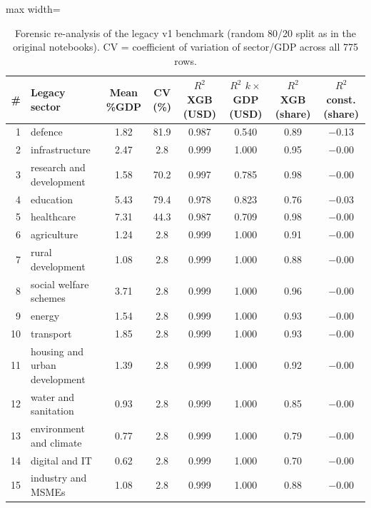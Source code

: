 \begin{table}
\caption{Forensic re-analysis of the legacy v1 benchmark (random 80/20 split as in the original notebooks). CV = coefficient of variation of sector/GDP across all 775 rows.}\label{tab:audit}
\centering\small
\renewcommand{\arraystretch}{1.1}
\begin{adjustbox}{max width=\linewidth}
\begin{tabular}{rlcccccc}
\toprule
\# & Legacy sector & Mean \%GDP & CV (\%) & $R^2$ XGB (USD) & $R^2$ $k\!\times$GDP (USD) & $R^2$ XGB (share) & $R^2$ const. (share) \\
\midrule
1 & defence & 1.82 & 81.9 & 0.987 & 0.540 & 0.89 & $-$0.13 \\
2 & infrastructure & 2.47 & 2.8 & 0.999 & 1.000 & 0.95 & $-$0.00 \\
3 & research and development & 1.58 & 70.2 & 0.997 & 0.785 & 0.98 & $-$0.00 \\
4 & education & 5.43 & 79.4 & 0.978 & 0.823 & 0.76 & $-$0.03 \\
5 & healthcare & 7.31 & 44.3 & 0.987 & 0.709 & 0.98 & $-$0.00 \\
6 & agriculture & 1.24 & 2.8 & 0.999 & 1.000 & 0.91 & $-$0.00 \\
7 & rural development & 1.08 & 2.8 & 0.999 & 1.000 & 0.88 & $-$0.00 \\
8 & social welfare schemes & 3.71 & 2.8 & 0.999 & 1.000 & 0.96 & $-$0.00 \\
9 & energy & 1.54 & 2.8 & 0.999 & 1.000 & 0.93 & $-$0.00 \\
10 & transport & 1.85 & 2.8 & 0.999 & 1.000 & 0.93 & $-$0.00 \\
11 & housing and urban development & 1.39 & 2.8 & 0.999 & 1.000 & 0.92 & $-$0.00 \\
12 & water and sanitation & 0.93 & 2.8 & 0.999 & 1.000 & 0.85 & $-$0.00 \\
13 & environment and climate & 0.77 & 2.8 & 0.999 & 1.000 & 0.79 & $-$0.00 \\
14 & digital and IT & 0.62 & 2.8 & 0.999 & 1.000 & 0.70 & $-$0.00 \\
15 & industry and MSMEs & 1.08 & 2.8 & 0.999 & 1.000 & 0.88 & $-$0.00 \\
\bottomrule
\end{tabular}\end{adjustbox}
\end{table}
